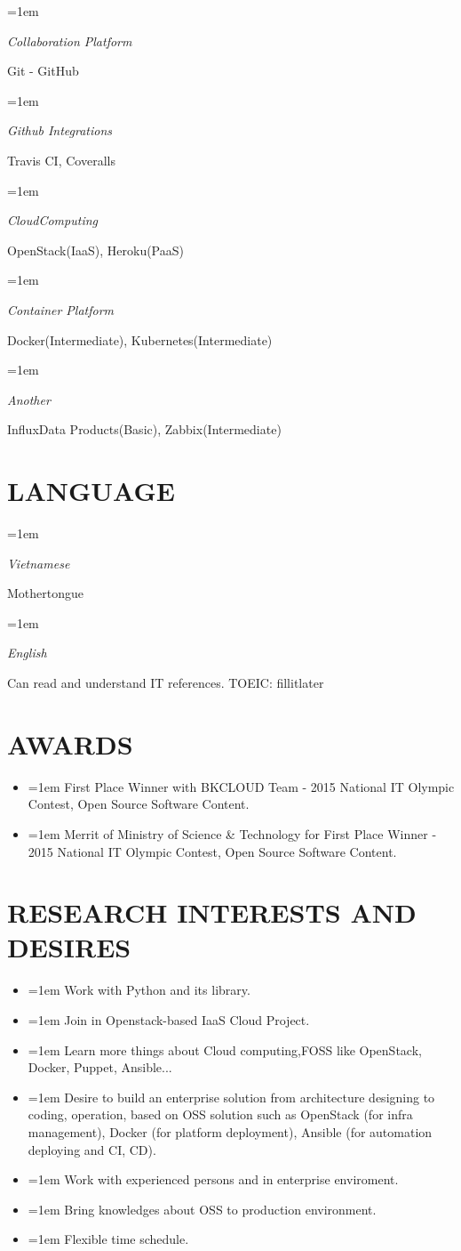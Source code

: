 \documentclass[paper=a4,fontsize=11pt]{scrartcl} %
\newlength{\spacebox}
\newcommand{\sepspace}{\vspace*{1.5em}}		%
\newcommand{\NewPart}[1]{\section*{\uppercase{#1}}}
\newcommand{\PersonalEntry}[2]{
		\noindent\hangindent=1em\hangafter=0 %
		\parbox{\spacebox}{        %
		\large\textit{#1}}		       %
		\hspace{2.5em} \large{#2} \par}    %
\newcommand{\SkillsEntry}[2]{      %
		\noindent\hangindent=1em\hangafter=0 %
		\parbox{\spacebox}{        %
		\large\textit{#1}}			   %
		\hspace{2.5em} \large{#2} \par}    %
\newcommand{\InterestsEntry}[1]{      %
		\noindent\hangindent=1em\hangafter=0 %
		\large{#1}}
\newcommand{\AwardsEntry}[1]{      %
		\noindent\hangindent=1em\hangafter=0 %
		\large{#1}}
\begin{document}
\SkillsEntry{Collaboration Platform}
	 {Git - GitHub}
\sepspace

\SkillsEntry{Github Integrations}
	{Travis CI, Coveralls}
\sepspace

\SkillsEntry{CloudComputing}
	 {OpenStack(IaaS), Heroku(PaaS)}
\sepspace

\SkillsEntry{Container Platform}
	{Docker(Intermediate), Kubernetes(Intermediate)}
\sepspace

\SkillsEntry{Another}
	 {InfluxData Products(Basic), Zabbix(Intermediate)}
\sepspace


\NewPart{Language}

\SkillsEntry{Vietnamese}{Mothertongue}
\sepspace

\SkillsEntry{English}{Can read and understand IT references. TOEIC: fillitlater}
\sepspace

\NewPart{Awards}

\begin{itemize}
\item \AwardsEntry{First Place Winner with BKCLOUD Team - 2015 National IT Olympic Contest, Open Source Software Content.}
\item \AwardsEntry{Merrit of Ministry of Science \& Technology for First Place Winner - 2015 National IT Olympic Contest, Open Source Software Content.}
\end{itemize}


\NewPart{Research Interests and Desires}

\begin{itemize}
\item \InterestsEntry{Work with Python and its library.}
\item \InterestsEntry{Join in Openstack-based IaaS Cloud Project.}
\item \InterestsEntry{Learn more things about Cloud computing,FOSS like OpenStack, Docker, Puppet, Ansible...}
\item \InterestsEntry{Desire to build an enterprise solution from architecture designing to coding, operation, based on OSS solution such as OpenStack (for infra management), Docker (for platform deployment), Ansible (for automation deploying and CI, CD).}
\item \InterestsEntry{Work with experienced persons and in enterprise enviroment.}
\item \InterestsEntry{Bring knowledges about OSS to production environment.}
\item \InterestsEntry{Flexible time schedule.}
\end{itemize}
\end{document}
